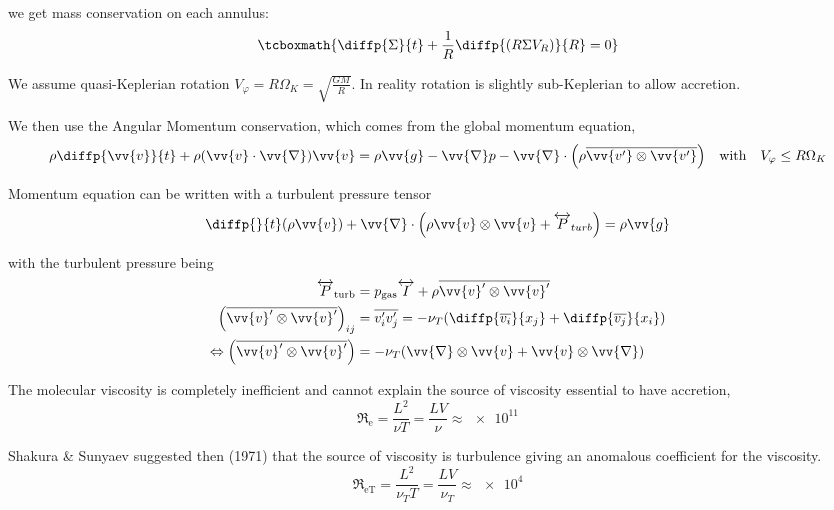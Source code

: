 \documentclass[10pt,a4paper,english]{article}
\let\originalleft\left
\let\originalright\right
\renewcommand{\left}{\mathopen{}\mathclose\bgroup\originalleft}
\renewcommand{\right}{\aftergroup\egroup\originalright}
\begin{document}
we get mass conservation on each annulus:
\begin{equation}
    \label{eq:alpha_mass}
    \tcboxmath{
        \diffp{\Sigma}{t} + \frac{1}{R} \diffp{(R \Sigma V_R)}{R} = 0
    }
\end{equation}

We assume quasi-Keplerian rotation $V_\varphi = R \Omega_K = \sqrt{\frac{G
M}{R}}$. In reality rotation is slightly sub-Keplerian to allow accretion.

We then use the Angular Momentum conservation, which comes from the global
momentum equation,
\begin{equation*}
    \rho \diffp{\vv{v}}{t} + \rho (\vv{v}\cdot\vv{\nabla})\vv{v} =
    \rho \vv{g} - \vv{\nabla} p - \vv{\nabla}\cdot\left(\rho \overline{\vv{v'} \otimes \vv{v'}}\right) \quad \text{with} \quad V_\varphi \leq R \Omega_K
\end{equation*}

Momentum equation can be written with a turbulent pressure tensor
\begin{equation*}
    \diffp{}{t}(\rho \vv{v}) + \vv{\nabla}\cdot\left(\rho \vv{v} \otimes \vv{v} + \tens{P}_{turb}\right) = \rho \vv{g}
\end{equation*}


with the turbulent pressure being
\begin{align*}
    \tens{P}_\mathrm{turb} &= p_\mathrm{gas} \tens{I} + \rho \overline{\vv{v}' \otimes \vv{v}'} \\
    \left(\overline{\vv{v}' \otimes \vv{v}'}\right)_{ij} &= \overline{v_i' v_j'} =
    - \nu_T \left( \diffp{\overline{v_i}}{{x_j}} + \diffp{\overline{v_j}}{{x_i}} \right) \\
    \Leftrightarrow \left(\overline{\vv{v}' \otimes \vv{v}'}\right) &=
    - \nu_T \left(\vv{\nabla} \otimes \vv{v} + \vv{v} \otimes \vv{\nabla}\right)
\end{align*}


The molecular viscosity is completely inefficient and cannot explain the source
of viscosity essential to have accretion,
\begin{equation*}
    \mathfrak{R}_\mathrm{e} = \frac{L^2}{\nu T} = \frac{L V}{\nu} \approx \num{e11}
\end{equation*}

Shakura \& Sunyaev suggested then (1971) that the source of viscosity is
turbulence giving an anomalous coefficient for the viscosity.
\begin{equation*}
    \mathfrak{R}_\mathrm{eT} = \frac{L^2}{\nu_T T} = \frac{L V}{\nu_T} \approx \num{e4}
\end{equation*}
\end{document}
